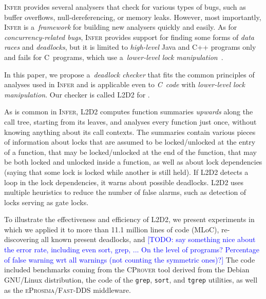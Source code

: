 \documentclass[runningheads]{llncs}
\newcommand{\todo}[1]{\textcolor{blue}{[TODO: #1]}}
\newcommand{\LLDD}{\textsc{L2D2}\xspace} %
\newcommand{\Infer}{\textsc{Infer}\xspace}
\newcommand{\CProver}{\textsc{CProver}\xspace}
\newcommand{\grep}{\texttt{grep}\xspace}
\newcommand{\sort}{\texttt{sort}\xspace}
\newcommand{\tgrep}{\texttt{tgrep}\xspace}
\newcommand{\eprosimaDDS}{\textsc{eProsima/Fast-DDS}\xspace}
\begin{document}
%

\Infer provides several analysers that check for various types of bugs, such as
buffer overflows, null-dereferencing, or memory leaks.  However, most
importantly, \Infer is a~\emph{framework} for building new analysers quickly and
easily. As for \emph{concurrency-related bugs}, \Infer provides support for
finding some forms of \emph{data races} and \emph{deadlocks}, but it is limited
to \emph{high-level} Java and C++ programs only and fails for C~programs, which
use a~\emph{lower-level lock manipulation}~\cite{racerD18,inferCACM19}.

In this paper, we propose a~\emph{deadlock checker} that fits the common
principles of analyses used in \Infer and is applicable even to \emph{C~code}
with \emph{lower-level lock manipulation}. Our checker is called \LLDD for
.

As is common in \Infer, \LLDD computes function summaries \emph{upwards} along
the call tree, starting from its leaves, and analyses every function just once,
without knowing anything about its call contexts.
%
The summaries contain various pieces of information about locks that are assumed
to be locked/unlocked at the entry of a function, that may be locked/unlocked at
the end of the function, that may be both locked and unlocked inside a function,
as well as about lock dependencies (saying that some lock is locked while
another is still held).
%
If \LLDD detects a loop in the lock dependencies, it warns about possible
deadlocks.
%
\LLDD uses multiple heuristics to reduce the number of false alarms, such as
detection of locks serving as gate locks.

To illustrate the effectiveness and efficiency of \LLDD, we present experiments
in which we applied it to more than 11.1 million lines of code (MLoC),
re-discovering all known present deadlocks, and \todo{say something nice about
the error rate, including even sort, grep, ... On the level of programs?
Percentage of false warning wrt all warnings (not counting the symmetric ones)?}
%
The code included benchmarks coming from the \CProver tool derived from the
Debian GNU/Linux distribution, the code of the \grep, \sort, and \tgrep
utilities, as well as the \eprosimaDDS middleware. 
\end{document}
